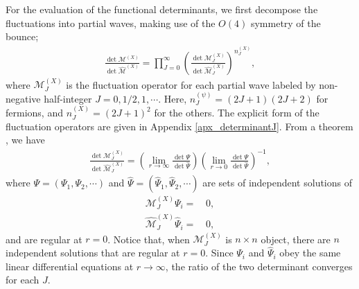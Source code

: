 \documentclass[12pt]{article}
\begin{document}
For the evaluation of the functional determinants, we first decompose
the fluctuations into partial waves, making use of the $O(4)$ symmetry
of the bounce;
\begin{align}
 \frac{\det\mathcal M^{(X)}}{\det \widehat{\mathcal M}^{(X)}}
 = \prod_{J=0}^{\infty}
 \left(
  \frac{\det \mathcal M^{(X)}_J}{\det \widehat{\mathcal M}^{(X)}_J}
 \right)^{n^{(X)}_J},
\end{align}
where $\mathcal M^{(X)}_J$ is the fluctuation operator for each
partial wave labeled by non-negative half-integer $J =
0,1/2,1,\cdots$. Here, $n^{(\psi)}_J = (2J+1)(2J+2)$ for fermions, and
$n^{(X)}_J = (2J+1)^2$ for the others.  The explicit form of the
fluctuation operators are given in Appendix
\ref{apx_determinantJ}. From a theorem \cite{Gelfand:1959nq,
  Dashen:1974ci, Kirsten:2003py, Kirsten:2004qv, Endo:2017tsz}, we
have
\begin{align}
 \frac{\det \mathcal M^{(X)}_J}{\det \widehat{\mathcal M}^{(X)}_J} =
 \left(
  \lim_{r\to\infty}\frac{\det\Psi}{\det\hat\Psi}
 \right)
 \left(
  \lim_{r\to0}\frac{\det\Psi}{\det\hat\Psi}
 \right)^{-1},
 \label{eq_theorem}
\end{align}
where $\Psi = (\Psi_1,\Psi_2,\cdots)$ and $\hat\Psi =
(\hat\Psi_1,\hat\Psi_2,\cdots)$ are sets of independent solutions of
\begin{align}
  \mathcal M^{(X)}_J\Psi_i = &\, 0,\\
  \widehat{\mathcal M}^{(X)}_J\hat\Psi_i = &\, 0,
\end{align}
and are regular at $r = 0$. Notice that, when $\mathcal M^{(X)}_J$ is
$n\times n$ object, there are $n$ independent solutions that are
regular at $r = 0$. Since $\Psi_i$ and $\hat\Psi_i$ obey the same
linear differential equations at $r\to\infty$, the ratio of the two
determinant converges for each $J$.
\end{document}

